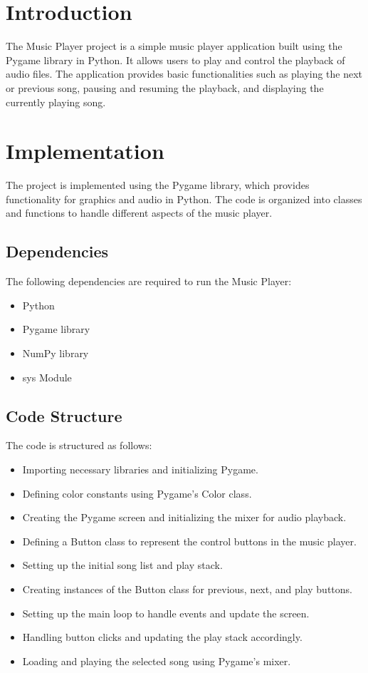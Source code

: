 \documentclass[journal,12pt,twocolumn]{IEEEtran}
\begin{document}
\section{Introduction}
The Music Player project is a simple music player application built using the Pygame library in Python. It allows users to play and control the playback of audio files. The application provides basic functionalities such as playing the next or previous song, pausing and resuming the playback, and displaying the currently playing song.

\section{Implementation}
The project is implemented using the Pygame library, which provides functionality for graphics and audio in Python. The code is organized into classes and functions to handle different aspects of the music player.

\subsection{Dependencies}
The following dependencies are required to run the Music Player:
\begin{itemize}
\item Python 
\item Pygame library
\item NumPy library
\item sys Module
\end{itemize}

\subsection{Code Structure}
The code is structured as follows:

\begin{itemize}
\item Importing necessary libraries and initializing Pygame.
\item Defining color constants using Pygame's Color class.
\item Creating the Pygame screen and initializing the mixer for audio playback.
\item Defining a Button class to represent the control buttons in the music player.
\item Setting up the initial song list and play stack.
\item Creating instances of the Button class for previous, next, and play buttons.
\item Setting up the main loop to handle events and update the screen.
\item Handling button clicks and updating the play stack accordingly.
\item Loading and playing the selected song using Pygame's mixer.
\end{itemize}
\end{document}
